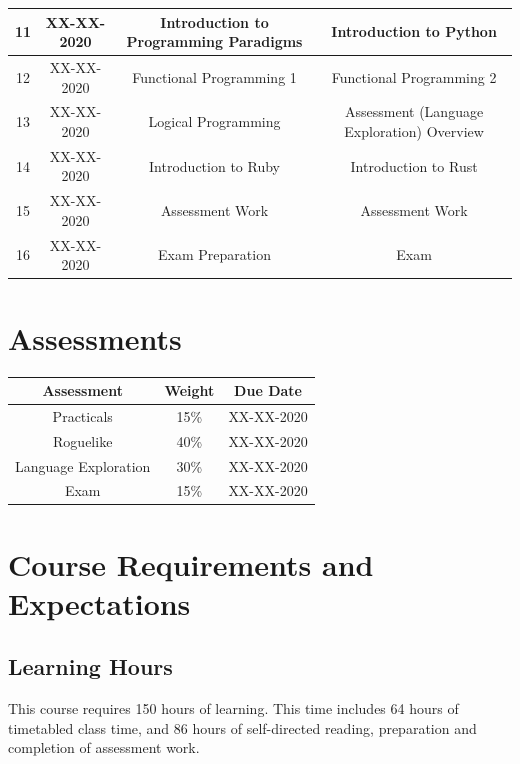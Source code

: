 \documentclass{article}
\begin{document}
\begin{tabular}{|c|c|c|c|}
  11            & XX-XX-2020    & Introduction to Programming Paradigms & Introduction to Python                     \\ \hline
  12            & XX-XX-2020    & Functional Programming 1              & Functional Programming 2                   \\ \hline
  13            & XX-XX-2020    & Logical Programming                   & Assessment (Language Exploration) Overview \\ \hline
  14            & XX-XX-2020    & Introduction to Ruby                  & Introduction to Rust                       \\ \hline
  15            & XX-XX-2020    & Assessment Work                       & Assessment Work                            \\ \hline
  16            & XX-XX-2020    & Exam Preparation                      & Exam                                       \\ \hline
\end{tabular}

\section*{Assessments}
\renewcommand{\arraystretch}{1.5}
\begin{tabular}{|c|c|c|}
  \hline
  \textbf{Assessment}  & \textbf{Weight} & \textbf{Due Date} \\ \hline
  Practicals           & 15\%            & XX-XX-2020        \\ \hline
  Roguelike            & 40\%            & XX-XX-2020        \\ \hline
  Language Exploration & 30\%            & XX-XX-2020        \\ \hline
  Exam                 & 15\%            & XX-XX-2020        \\ \hline
\end{tabular}

\section*{Course Requirements and Expectations}

\subsection*{Learning Hours}
This course requires 150 hours of learning. This time includes 64 hours of timetabled class time, and 86 hours of self-directed reading, preparation and completion of assessment work.
\end{document}
